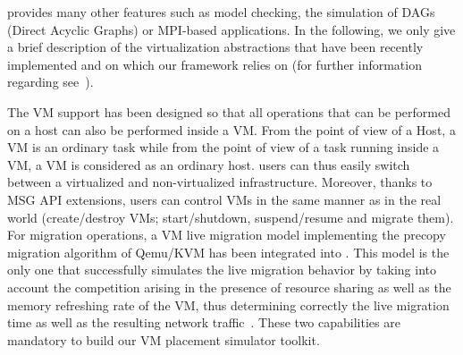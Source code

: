 \sg provides many other features such as model checking, the
simulation of DAGs (Direct Acyclic Graphs) or MPI-based
applications. In the following, we only give a brief description of
the virtualization abstractions that have been recently implemented
and on which our framework relies on (for further information regarding
\sg see~\cite{casanova:hal-01017319}).

The VM support has been designed so that all operations that can be
performed on a host can also be performed inside a VM. From the point
of view of a \sg Host, a \sg VM is an ordinary task while from the
point of view of a task running inside a \sg VM, a VM is considered as
an ordinary host.
\sg users can thus easily switch between a virtualized and
non-virtualized infrastructure.  Moreover, thanks to MSG API
extensions, users can control VMs in the same manner as in the real
world (\eg create/destroy VMs; start/shutdown, suspend/resume and
migrate them).
For migration operations, a VM live migration model implementing the
precopy migration algorithm of Qemu/KVM has been integrated into \sg.
This model is the only one that successfully simulates the live
migration behavior by taking into account the competition arising in
the presence of resource sharing as well as the memory refreshing rate
of the VM, thus determining correctly the live migration time as well
as the resulting network
traffic~\cite{Hirofuchi:2013:ALM:2568486.2568524}.
%
%
These two capabilities are mandatory to build our VM placement
simulator toolkit.
